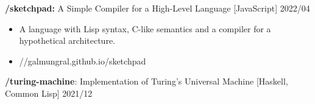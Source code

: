 \documentclass[10pt]{article}
\begin{document}
\vspace{0.5em}
\textbf{/sketchpad:} A Simple Compiler for a High-Level Language [JavaScript] \hfill 2022/04
\begin{itemize}
\item A language with Lisp syntax, C-like semantics and a compiler for a hypothetical architecture.
\item //galmungral.github.io/sketchpad
\end{itemize}

\vspace{0.5em}
\textbf{/turing-machine}:  Implementation of Turing's Universal Machine [Haskell, Common Lisp] \hfill 2021/12

\end{document}
